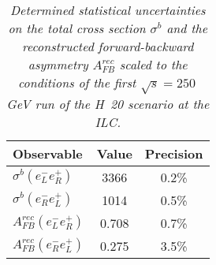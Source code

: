         \begin{table}
        \begin{center}
        \begin{tabular}{l c c}
        \hline
	Observable & Value & Precision \\
	\hline
	$\sigma^b (e^-_Le^+_R)$ & 3366\ifb & 0.2\% \\
	$\sigma^b (e^-_Re^+_L)$ & 1014\ifb & 0.5\% \\
	$A_{FB}^{rec} (e^-_Le^+_R)$& 0.708 & 0.7\% \\
	$A_{FB}^{rec} (e^-_Re^+_L)$ & 0.275 & 3.5\% \\
        \hline
        \end{tabular}
        \end{center}
        \caption{\sl Determined statistical uncertainties on the total cross section $\sigma^b$ and the reconstructed forward-backward asymmetry $A_{FB}^{rec}$ scaled to the conditions of the first $\sqrt{s}=250$\,GeV run of the H~20 scenario at the ILC. }
        \label{table:bbbarfinal}
        \end{table}
